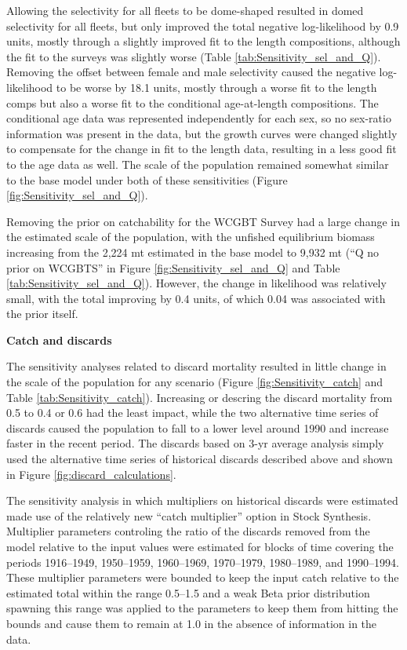 \documentclass[12pt,]{article}
\begin{document}
Allowing the selectivity for all fleets to be dome-shaped resulted in
domed selectivity for all fleets, but only improved the total negative
log-likelihood by 0.9 units, mostly through a slightly improved fit to
the length compositions, although the fit to the surveys was slightly
worse (Table \ref{tab:Sensitivity_sel_and_Q}). Removing the offset
between female and male selectivity caused the negative log-likelihood
to be worse by 18.1 units, mostly through a worse fit to the length
comps but also a worse fit to the conditional age-at-length
compositions. The conditional age data was represented independently for
each sex, so no sex-ratio information was present in the data, but the
growth curves were changed slightly to compensate for the change in fit
to the length data, resulting in a less good fit to the age data as
well. The scale of the population remained somewhat similar to the base
model under both of these sensitivities (Figure
\ref{fig:Sensitivity_sel_and_Q}).

Removing the prior on catchability for the WCGBT Survey had a large
change in the estimated scale of the population, with the unfished
equilibrium biomass increasing from the 2,224 mt estimated in the base
model to 9,932 mt (``Q no prior on WCGBTS'' in Figure
\ref{fig:Sensitivity_sel_and_Q} and Table
\ref{tab:Sensitivity_sel_and_Q}). However, the change in likelihood was
relatively small, with the total improving by 0.4 units, of which 0.04
was associated with the prior itself.

\textbf{Catch and discards}

The sensitivity analyses related to discard mortality resulted in little
change in the scale of the population for any scenario (Figure
\ref{fig:Sensitivity_catch} and Table \ref{tab:Sensitivity_catch}).
Increasing or descring the discard mortality from 0.5 to 0.4 or 0.6 had
the least impact, while the two alternative time series of discards
caused the population to fall to a lower level around 1990 and increase
faster in the recent period. The discards based on 3-yr average analysis
simply used the alternative time series of historical discards described
above and shown in Figure \ref{fig:discard_calculations}.

The sensitivity analysis in which multipliers on historical discards
were estimated made use of the relatively new ``catch multiplier''
option in Stock Synthesis. Multiplier parameters controling the ratio of
the discards removed from the model relative to the input values were
estimated for blocks of time covering the periods 1916--1949,
1950--1959, 1960--1969, 1970--1979, 1980--1989, and 1990--1994. These
multiplier parameters were bounded to keep the input catch relative to
the estimated total within the range 0.5--1.5 and a weak Beta prior
distribution spawning this range was applied to the parameters to keep
them from hitting the bounds and cause them to remain at 1.0 in the
absence of information in the data.
\end{document}
